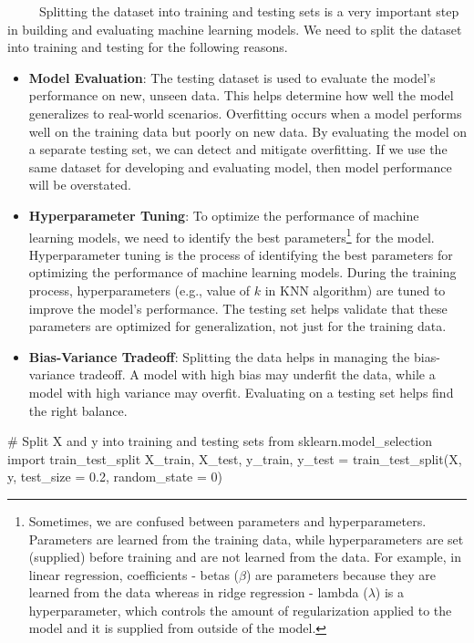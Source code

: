 \documentclass[
  letterpaper,
  DIV=11,
  numbers=noendperiod]{scrreprt}
\newenvironment{Shaded}{\begin{snugshade}}{\end{snugshade}}
\newcommand{\CommentTok}[1]{\textcolor[rgb]{0.37,0.37,0.37}{#1}}
\newcommand{\DecValTok}[1]{\textcolor[rgb]{0.68,0.00,0.00}{#1}}
\newcommand{\FloatTok}[1]{\textcolor[rgb]{0.68,0.00,0.00}{#1}}
\newcommand{\ImportTok}[1]{\textcolor[rgb]{0.00,0.46,0.62}{#1}}
\newcommand{\NormalTok}[1]{\textcolor[rgb]{0.00,0.23,0.31}{#1}}
\newcommand{\OperatorTok}[1]{\textcolor[rgb]{0.37,0.37,0.37}{#1}}
\begin{document}
~~~~~Splitting the dataset into training and testing sets is a very
important step in building and evaluating machine learning models. We
need to split the dataset into training and testing for the following
reasons.

\begin{itemize}
\item
  \textbf{Model Evaluation}: The testing dataset is used to evaluate the
  model's performance on new, unseen data. This helps determine how well
  the model generalizes to real-world scenarios. Overfitting occurs when
  a model performs well on the training data but poorly on new data. By
  evaluating the model on a separate testing set, we can detect and
  mitigate overfitting. If we use the same dataset for developing and
  evaluating model, then model performance will be overstated.
\item
  \textbf{Hyperparameter Tuning}: To optimize the performance of machine
  learning models, we need to identify the best parameters\footnote{Sometimes,
    we are confused between parameters and hyperparameters. Parameters
    are learned from the training data, while hyperparameters are set
    (supplied) before training and are not learned from the data. For
    example, in linear regression, coefficients - betas (\(\beta\)) are
    parameters because they are learned from the data whereas in ridge
    regression - lambda (\(\lambda\)) is a hyperparameter, which
    controls the amount of regularization applied to the model and it is
    supplied from outside of the model.} for the model. Hyperparameter
  tuning is the process of identifying the best parameters for
  optimizing the performance of machine learning models. During the
  training process, hyperparameters (e.g., value of \(k\) in KNN
  algorithm) are tuned to improve the model's performance. The testing
  set helps validate that these parameters are optimized for
  generalization, not just for the training data.
\item
  \textbf{Bias-Variance Tradeoff}: Splitting the data helps in managing
  the bias-variance tradeoff. A model with high bias may underfit the
  data, while a model with high variance may overfit. Evaluating on a
  testing set helps find the right balance.
\end{itemize}

\begin{Shaded}
\begin{Highlighting}[]
\CommentTok{\# Split X and y into training and testing sets}
\ImportTok{from}\NormalTok{ sklearn.model\_selection }\ImportTok{import}\NormalTok{ train\_test\_split}
\NormalTok{X\_train, X\_test, y\_train, y\_test }\OperatorTok{=}\NormalTok{ train\_test\_split(X, y, test\_size }\OperatorTok{=} \FloatTok{0.2}\NormalTok{, random\_state }\OperatorTok{=} \DecValTok{0}\NormalTok{)}
\end{Highlighting}
\end{Shaded}
\end{document}
